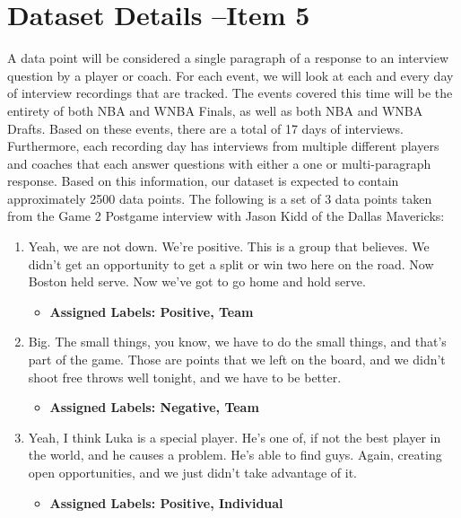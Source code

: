 \documentclass[titlepage]{article}
\begin{document}
\section{Dataset Details --Item 5}
\indent A data point will be considered a single paragraph of a
response to an interview question by a player or coach.
For each event, we will look at each and every day of interview
recordings that are tracked. The events covered
this time will be the entirety of both NBA and WNBA Finals, as well
as both NBA and WNBA Drafts. Based on these
events, there are a total of 17 days of interviews. Furthermore, each
recording day has interviews from multiple
different players and coaches that each answer questions with either
a one or multi-paragraph response. Based on
this information, our dataset is expected to contain approximately
2500 data points.
\newline \newline
\indent The following is a set of 3 data points taken from the Game 2
Postgame interview with Jason Kidd of the Dallas
Mavericks:
\begin{enumerate}
  \item Yeah, we are not down. We're positive. This is a group that
    believes. We didn't get an opportunity to get a
    split or win two here on the road. Now Boston held serve. Now
    we've got to go home and hold serve.
    \begin{itemize}
      \item \textbf{Assigned Labels: Positive, Team}
    \end{itemize}

  \item Big. The small things, you know, we have to do the small
    things, and that's part of the game. Those are points
    that we left on the board, and we didn't shoot free throws well
    tonight, and we have to be better.
    \begin{itemize}
      \item \textbf{Assigned Labels: Negative, Team}
    \end{itemize}

  \item Yeah, I think Luka is a special player. He's one of, if not
    the best player in the world, and he causes a problem.
    He's able to find guys. Again, creating open opportunities, and
    we just didn't take advantage of it.
    \begin{itemize}
      \item \textbf{Assigned Labels: Positive, Individual}
    \end{itemize}
\end{enumerate}
\end{document}
